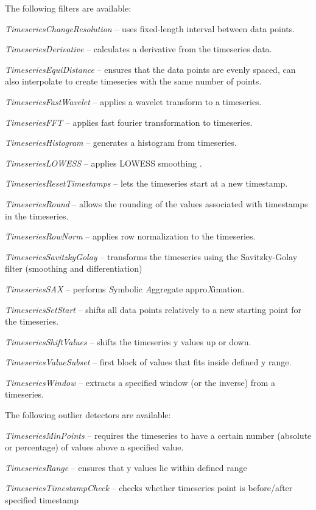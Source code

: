 \documentclass[a4paper]{book}
\begin{document}
\noindent The following filters are available:
\begin{tight_itemize}
	\item \textit{TimeseriesChangeResolution} -- uses fixed-length interval between data points.
	\item \textit{TimeseriesDerivative} -- calculates a derivative from the timeseries
	data.
	\item \textit{TimeseriesEquiDistance} -- ensures that the data points are evenly
	spaced, can also interpolate to create timeseries with the same number of
	points.
	\item \textit{TimeseriesFastWavelet} -- applies a wavelet transform to a timeseries.
	\item \textit{TimeseriesFFT} -- applies fast fourier transformation to timeseries.
	\item \textit{TimeseriesHistogram} -- generates a histogram from timeseries.
	\item \textit{TimeseriesLOWESS} -- applies LOWESS smoothing \cite{lowess}.
	\item \textit{TimeseriesResetTimestamps} -- lets the timeseries start at a new timestamp.
	\item \textit{TimeseriesRound} -- allows the rounding of the values associated with
	timestamps in the timeseries.
	\item \textit{TimeseriesRowNorm} -- applies row normalization to the timeseries.
	\item \textit{TimeseriesSavitzkyGolay} -- transforms the timeseries using the
	Savitzky-Golay filter (smoothing and differentiation) \cite{savitzky}
	\item \textit{TimeseriesSAX} -- performs \textit{S}ymbolic \textit{A}ggregate appro\textit{X}imation.
	\item \textit{TimeseriesSetStart} -- shifts all data points relatively to a new
	starting point for the timeseries.
	\item \textit{TimeseriesShiftValues} -- shifts the timeseries y values up or down.
	\item \textit{TimeseriesValueSubset} -- first block of values that fits inside defined y range.
	\item \textit{TimeseriesWindow} -- extracts a specified window (or the inverse) from
	a timeseries.
\end{tight_itemize}

\noindent The following outlier detectors are available:
\begin{tight_itemize}
	\item \textit{TimeseriesMinPoints} -- requires the timeseries to have a certain
	number (absolute or percentage) of values above a specified value.
	\item \textit{TimeseriesRange} -- ensures that y values lie within defined range
	\item \textit{TimeseriesTimestampCheck} -- checks whether timeseries point is
	before/after specified timestamp
\end{tight_itemize}
\end{document}

